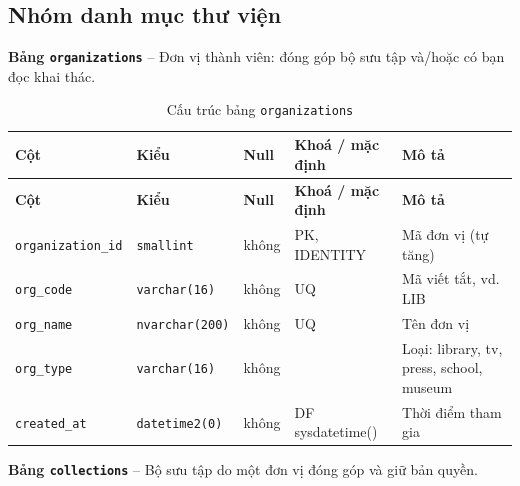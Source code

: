 \subsection{Nhóm danh mục thư viện}

\textbf{Bảng \texttt{organizations}} -- Đơn vị thành viên: đóng góp bộ sưu tập và/hoặc có bạn đọc khai thác.

\setlength{\tabcolsep}{4pt}
\begin{longtable}{>{\raggedright\arraybackslash}p{}>{\raggedright\arraybackslash}p{}>{\centering\arraybackslash}p{}>{\raggedright\arraybackslash}p{}>{\raggedright\arraybackslash}p{}}
\caption{Cấu trúc bảng \texttt{organizations}}\label{tab:col_organizations}\\
\toprule \textbf{Cột} & \textbf{Kiểu} & \textbf{Null} & \textbf{Khoá / mặc định} & \textbf{Mô tả} \\ \midrule \endfirsthead
\toprule \textbf{Cột} & \textbf{Kiểu} & \textbf{Null} & \textbf{Khoá / mặc định} & \textbf{Mô tả} \\ \midrule \endhead
\bottomrule \endfoot
\texttt{organization\_id} & {\footnotesize\texttt{smallint}} & không & PK, IDENTITY & Mã đơn vị (tự tăng) \\
\texttt{org\_code} & {\footnotesize\texttt{varchar(16)}} & không & UQ & Mã viết tắt, vd. LIB \\
\texttt{org\_name} & {\footnotesize\texttt{nvarchar(200)}} & không & UQ & Tên đơn vị \\
\texttt{org\_type} & {\footnotesize\texttt{varchar(16)}} & không &  & Loại: library, tv, press, school, museum \\
\texttt{created\_at} & {\footnotesize\texttt{datetime2(0)}} & không & DF sysdatetime() & Thời điểm tham gia \\
\end{longtable}

\textbf{Bảng \texttt{collections}} -- Bộ sưu tập do một đơn vị đóng góp và giữ bản quyền.

